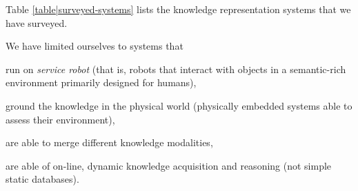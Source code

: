Table \ref{table|surveyed-systems} lists the knowledge representation
systems that we have surveyed.

We have limited ourselves to systems that
\begin{inparaenum} 
    \item  run on \emph{service robot} (that is, robots that interact with 
    objects in a semantic-rich environment primarily designed for humans),
    \item  ground the knowledge in the physical world (physically embedded
    systems able to assess their environment),
    \item  are able to merge different knowledge modalities,
    \item  are able of on-line, dynamic knowledge acquisition and reasoning 
    (\ie not simple static databases).
\end{inparaenum}


